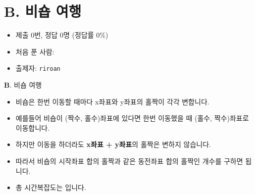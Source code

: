 \section{B. 비숍 여행}

\begin{frame} %
    \begin{itemize}
        \item 제출 0번, 정답 0명 (정답률 0\%)
        \item 처음 푼 사람: \textbf{} 
        \item 출제자: \texttt{riroan}
    \end{itemize}
\end{frame}

\begin{frame}{\textbf{B}. 비숍 여행}
    \begin{itemize}
    	\item 비숍은 한번 이동할 때마다 x좌표와 y좌표의 홀짝이 각각 변합니다.
    	\item 예를들어 비숍이 (짝수, 홀수)좌표에 있다면 한번 이동했을 때 (홀수, 짝수)좌표로 이동합니다.
    	\item 하지만 이동을 하더라도 \textbf{x좌표 + y좌표}의 홀짝은 변하지 않습니다.
    	\item 따라서 비숍의 시작좌표 합의 홀짝과 같은 동전좌표 합의 홀짝인 개수를 구하면 됩니다.
    	\item 총 시간복잡도는 입니다.
    \end{itemize}
\end{frame}